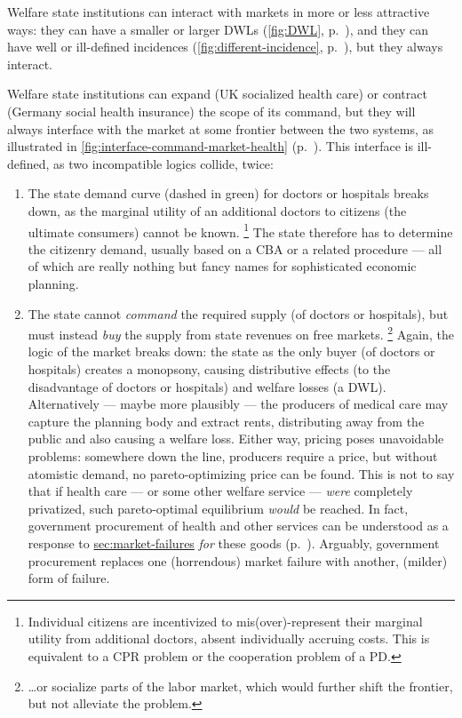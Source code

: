Welfare state institutions can interact with markets in more or less attractive ways:
they can have a smaller or larger \glspl{DWL} (\autoref{fig:DWL}, p.~\pageref{fig:DWL}), and they can have well or ill-defined incidences (\autoref{fig:different-incidence}, p.~\pageref{fig:different-incidence}), but they always interact.%

Welfare state institutions can expand (UK socialized health care) or contract (Germany social health insurance) the scope of its command, but they will always interface with the market at some frontier between the two systems, as illustrated in \autoref{fig:interface-command-market-health} (p.~\pageref{fig:interface-command-market-health}).
This interface is ill-defined, as two incompatible logics collide, twice:

\begin{enumerate}
	\item The state demand curve (dashed in green) for doctors or hospitals breaks down, as the marginal utility of an additional doctors to citizens (the ultimate consumers) cannot be known.
	\footnote{
		Individual citizens are incentivized to mis(over)-represent their marginal utility from additional doctors, absent individually accruing costs.
		This is equivalent to a \gls{CPR} problem or the cooperation problem of a \gls{PD}.
	}
	The state therefore has to determine the citizenry demand, usually based on a \gls{CBA} or a related procedure --- all of which are really nothing but fancy names for sophisticated economic planning.

	\item The state cannot \emph{command} the required supply (of doctors or hospitals), but must instead \emph{buy} the supply from state revenues on free markets.
	\footnote{
		\ldots or socialize parts of the labor market, which would further shift the frontier, but not alleviate the problem.
	}
	Again, the logic of the market breaks down:
	the state as the only buyer (of doctors or hospitals) creates a monopsony, causing distributive effects (to the disadvantage of doctors or hospitals) and welfare losses (a \gls{DWL}).
	Alternatively --- maybe more plausibly --- the producers of medical care may capture the planning body and extract rents, distributing away from the public and also causing a welfare loss.
	Either way, pricing poses unavoidable problems:
	somewhere down the line, producers require a price, but without atomistic demand, no pareto-optimizing price can be found.
	This is not to say that if health care --- or some other welfare service --- \emph{were} completely privatized, such pareto-optimal equilibrium \emph{would} be reached.
	In fact, government procurement of health and other services can be understood as a response to \hyperref[failed atomistic markets]{sec:market-failures} \emph{for} these goods (p.~\pageref{sec:market-failures}).
	Arguably, government procurement replaces one (horrendous) market failure with another, (milder) form of failure.
\end{enumerate}

